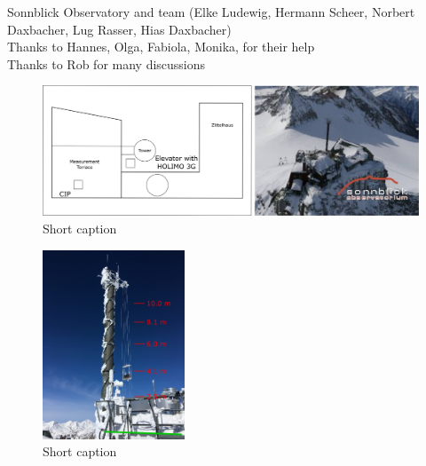 \documentclass[draft,linenumbers]{agujournal}
\begin{document}
{\begin{acronyms}
\end{acronyms}


\acknowledgments
Sonnblick Observatory and team (Elke Ludewig, Hermann Scheer, Norbert Daxbacher, Lug Rasser, Hias Daxbacher)\\
Thanks to Hannes, Olga, Fabiola, Monika, for their help\\
Thanks to Rob for many discussions



\newpage

\begin{figure}[h]
 \centering
 	\includegraphics[width=30pc]{SetUp.png}
 \caption{Short caption}
 \label{fig:SetUp}
\end{figure}

\begin{figure}[h]
 \centering
 	\includegraphics[width=10pc]{tower.png}
 \caption{Short caption}
 \label{fig:Elevator}
\end{figure}

}
\end{document}
